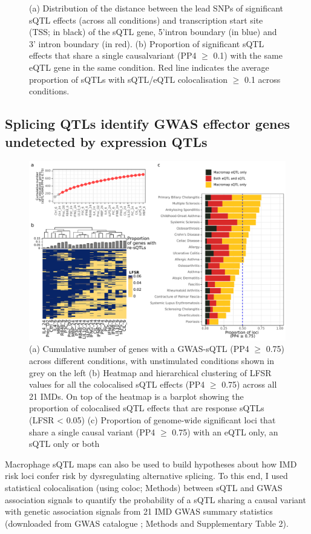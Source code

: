 \begin{figure}[H]
     \caption{(a) Distribution of the distance between the lead SNPs of significant sQTL effects (across all conditions) and transcription start site (TSS; in black) of the sQTL gene, 5'intron boundary (in blue) and 3' intron boundary (in red). (b) Proportion of significant sQTL effects that share a single causalvariant (PP4 $\geq$ 0.1) with the same eQTL gene in the same condition. Red line indicates the average proportion of sQTLs with sQTL/eQTL colocalisation $\geq$ 0.1 across conditions.}
     \label{fig:tss_esqtl}
\end{figure}



\subsection{Splicing QTLs identify GWAS effector genes undetected by expression QTLs}
\begin{figure}[H]
  \centering
  \includegraphics[width=\textwidth]{coloc_sqtl}
  \caption{(a) Cumulative number of genes with a GWAS-sQTL (PP4 $\geq$ 0.75) across different conditions, with unstimulated conditions shown in grey on the left (b) Heatmap and hierarchical clustering of LFSR values for all the colocalised sQTL effects (PP4 $\geq$ 0.75) across all 21 IMDs. On top of the heatmap is a barplot showing the proportion of colocalised sQTL effects that are response sQTLs (LFSR < 0.05) (c) Proportion of genome-wide significant loci that share a single causal variant (PP4 $\geq$ 0.75) with an eQTL only, an sQTL only or both }
  \label{fig:coloc}   
\end{figure}
Macrophage sQTL maps can also be used to build hypotheses about how IMD risk loci confer risk by dysregulating alternative splicing. To this end, I used statistical colocalisation (using coloc; Methods) between sQTL and GWAS association signals to quantify the probability of a sQTL sharing a causal variant with genetic association signals from 21 IMD GWAS summary statistics (downloaded from GWAS catalogue \cite{Buniello2019-wb}; Methods and Supplementary Table 2). \\

